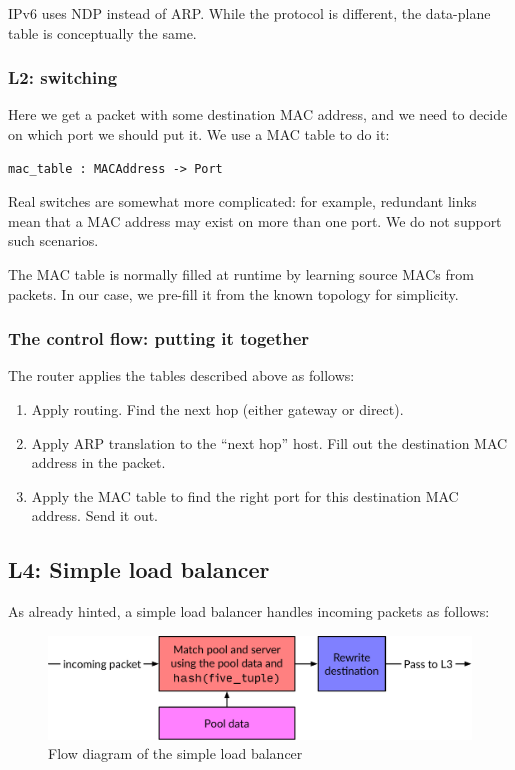 \documentclass[11pt,oneside,a4paper]{article}
\begin{document}
IPv6 uses NDP instead of ARP.
While the protocol is different, the data-plane table is conceptually the same.

\subsubsection{L2: switching}

Here we get a packet with some destination MAC address, and we need to decide on
which port we should put it.
We use a MAC table to do it:

\begin{verbatim}
mac_table : MACAddress -> Port
\end{verbatim}

Real switches are somewhat more complicated: for example, redundant links mean
that a MAC address may exist on more than one port.
We do not support such scenarios.

The MAC table is normally filled at runtime by learning source MACs from
packets.
In our case, we pre-fill it from the known topology for simplicity.

\subsubsection{The control flow: putting it together}
The router applies the tables described above as follows:

\begin{enumerate}
\item Apply routing.
    Find the next hop (either gateway or direct).
\item Apply ARP translation to the ``next hop'' host.
    Fill out the destination MAC address in the packet.
\item Apply the MAC table to find the right port for this destination MAC address.
    Send it out.
\end{enumerate}

\subsection{L4: Simple load balancer}
As already hinted, a simple load balancer handles incoming packets as follows:

\begin{figure}[h]
\centering
\includegraphics[width=.8\textwidth]{figures/simple-packet.pdf}
\caption{Flow diagram of the simple load balancer}
\label{fig:simple-packet}
\end{figure}
\end{document}

